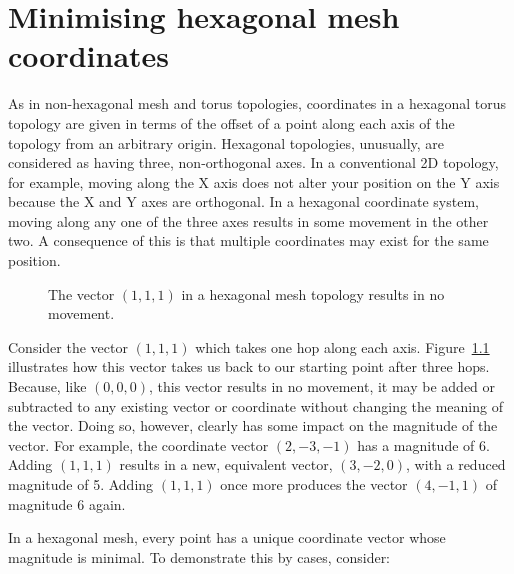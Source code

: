 \chapter{Minimising hexagonal mesh coordinates}
	\label{app:minimal-hex-coordinates}
	
	As in non-hexagonal mesh and torus topologies, coordinates in a hexagonal
	torus topology are given in terms of the offset of a point along each axis of
	the topology from an arbitrary origin. Hexagonal topologies, unusually, are
	considered as having three, non-orthogonal axes. In a conventional 2D
	topology, for example, moving along the X axis does not alter your position
	on the Y axis because the X and Y axes are orthogonal. In a hexagonal
	coordinate system, moving along any one of the three axes results in some
	movement in the other two.  A consequence of this is that multiple
	coordinates may exist for the same position.
	
	\begin{figure}
		\center
		\caption[$(1,1,1)$ in a hexagonal mesh or torus.]%
		{The vector $(1, 1, 1)$ in a hexagonal mesh topology results in
		no movement.}
		\label{fig:hex-mesh-loop}
	\end{figure}
	
	Consider the vector $(1,1,1)$ which takes one hop along each axis.
	Figure~\ref{fig:hex-mesh-loop} illustrates how this vector takes us back to
	our starting point after three hops. Because, like $(0,0,0)$, this vector
	results in no movement, it may be added or subtracted to any existing vector
	or coordinate without changing the meaning of the vector. Doing so, however,
	clearly has some impact on the magnitude of the vector. For example, the
	coordinate vector $(2, -3, -1)$ has a magnitude of 6. Adding $(1,1,1)$
	results in a new, equivalent vector, $(3, -2, 0)$, with a reduced magnitude
	of 5.  Adding $(1,1,1)$ once more produces the vector $(4, -1, 1)$ of
	magnitude 6 again.
	
	In a hexagonal mesh, every point has a unique coordinate vector whose
	magnitude is minimal. To demonstrate this by cases, consider:
	
